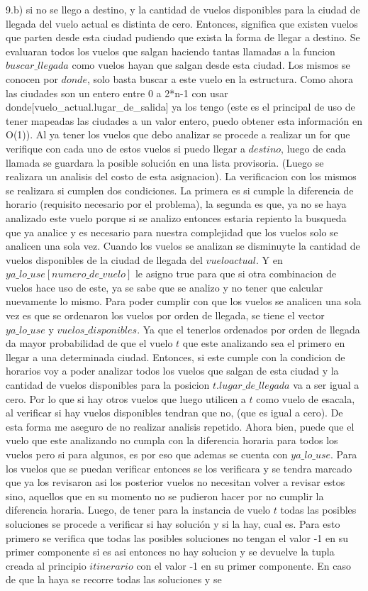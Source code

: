 \documentclass{article}
\begin{document}
9.b) si no se llego a destino, y la cantidad de vuelos disponibles para la ciudad de llegada del vuelo actual es distinta de cero. Entonces, significa que existen vuelos que parten desde esta ciudad pudiendo que exista la forma de llegar a destino. Se evaluaran todos los vuelos que salgan haciendo tantas llamadas a la funcion $buscar\_llegada$ como vuelos hayan que salgan desde esta ciudad. Los mismos se conocen por $donde$, solo basta buscar a este vuelo en la estructura. Como ahora las ciudades son un entero entre 0 a 2*n-1 con usar donde[vuelo\_actual.lugar\_de\_salida] ya los tengo (este es el principal de uso de tener mapeadas las ciudades a un valor entero, puedo obtener esta información en O(1)). Al ya tener los vuelos que debo analizar se procede a realizar un for que verifique con cada uno de estos vuelos si puedo llegar a $destino$, luego de cada llamada se guardara la posible solución en una lista provisoria. (Luego se realizara un analisis del costo de esta asignacion). La verificacion con los mismos se realizara si cumplen dos condiciones. La primera es si cumple la diferencia de horario (requisito necesario por el problema), la segunda es que, ya no se haya analizado este vuelo porque si se analizo entonces estaria repiento la busqueda que ya analice y es necesario para nuestra complejidad que los vuelos solo se analicen una sola vez. Cuando los vuelos se analizan se disminuyte la cantidad de vuelos disponibles de la ciudad de llegada del $vuelo actual$. Y  en$ya\_lo\_use[numero\_de\_vuelo]$ le asigno true para que si otra combinacion de vuelos hace uso de este, ya se sabe que se analizo y no tener que calcular nuevamente lo mismo. Para poder cumplir con que los vuelos se analicen una sola vez  es que se ordenaron los vuelos por orden de llegada, se tiene el vector $ya\_lo\_use$ y $vuelos\_disponibles$. Ya que el tenerlos ordenados por orden de llegada da mayor probabilidad de que el vuelo $t$ que este analizando sea el primero en llegar a una determinada ciudad. Entonces, si este cumple con la condicion de horarios voy a poder analizar todos los vuelos que salgan de esta ciudad y la cantidad de vuelos disponibles para la posicion $t.lugar\_de\_llegada$ va a ser igual a cero. Por lo que si hay otros vuelos que luego utilicen a $t$ como vuelo de esacala, al verificar si hay vuelos disponibles tendran que no, (que es igual a cero). De esta forma me aseguro de no realizar analisis repetido. Ahora bien, puede que el vuelo que este analizando no cumpla con la diferencia horaria para todos los vuelos pero si para algunos, es por eso que ademas se cuenta con $ya\_lo\_use$. Para los vuelos que se puedan verificar entonces se los verificara y se tendra marcado que ya los revisaron asi los posterior vuelos no necesitan volver a revisar estos sino, aquellos que en su momento no se pudieron hacer por no cumplir la diferencia horaria.  Luego, de tener para la instancia de vuelo $t$ todas las posibles soluciones se procede a verificar si hay solución y si la hay, cual es. Para esto primero se verifica que todas las posibles soluciones no tengan el valor -1 en su primer componente si es asi entonces no hay solucion y se devuelve la tupla creada al principio $itinerario$ con el valor -1 en su primer componente. En caso de que la haya se recorre todas las soluciones y se 
\end{document}
